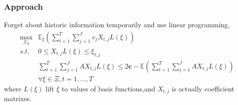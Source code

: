 \documentclass{beamer}
\begin{document}
\begin{frame}
\frametitle{Approach}
Forget about historic information temporarily and use linear programming,
\begin{equation}
\begin{array}{ll}
\max\limits_{\mathbf{\mathcal{X}_t}} &\mathbb{E}_{\xi}\left(\sum\limits^T_{t=1} \sum\limits^J_{j=1} v_j X_{t,j} L(\xi)\right)\\
s.t. & 0\leq X_{t,j} L(\xi) \leq \xi_{t,j}\\
& \sum\limits_{t=1}^T\sum\limits^J_{j=1} A X_{t,j} L(\xi) \leq 2\mathbf{c} - \mathbb{E}(\sum\limits_{t=1}^T \sum\limits^J_{j=1} A X_{t,j} L(\xi))\\
&\forall \xi \in \Xi,t=1,\ldots,T
\end{array}
\label{originthird}
\end{equation}
where $L(\xi)$ lift $\xi$ to values of basis functions,and $X_{t,j}$ is actually coefficient matrixes.
\end{frame}
\end{document}
